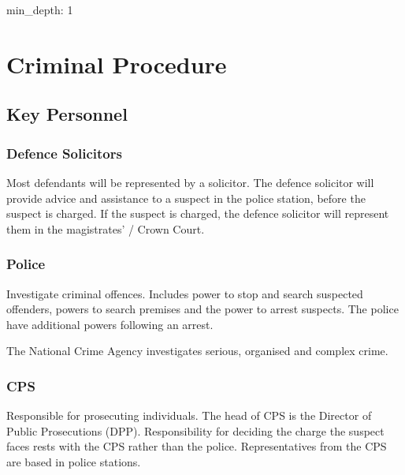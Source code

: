 \documentclass[
]{article}
\author{}
\date{}
\newenvironment{Shaded}{}{}
\newcommand{\NormalTok}[1]{#1}
\begin{document}
{
\setcounter{tocdepth}{3}
\tableofcontents
}
\begin{Shaded}
\begin{Highlighting}[]
\NormalTok{min\_depth: 1}
\end{Highlighting}
\end{Shaded}

\hypertarget{criminal-procedure}{%
\section{Criminal Procedure}\label{criminal-procedure}}

\hypertarget{key-personnel}{%
\subsection{Key Personnel}\label{key-personnel}}

\hypertarget{defence-solicitors}{%
\subsubsection{Defence Solicitors}\label{defence-solicitors}}

Most defendants will be represented by a solicitor. The defence
solicitor will provide advice and assistance to a suspect in the police
station, before the suspect is charged. If the suspect is charged, the
defence solicitor will represent them in the magistrates' / Crown Court.

\hypertarget{police}{%
\subsubsection{Police}\label{police}}

Investigate criminal offences. Includes power to stop and search
suspected offenders, powers to search premises and the power to arrest
suspects. The police have additional powers following an arrest.

The National Crime Agency investigates serious, organised and complex
crime.

\hypertarget{cps}{%
\subsubsection{CPS}\label{cps}}

Responsible for prosecuting individuals. The head of CPS is the Director
of Public Prosecutions (DPP). Responsibility for deciding the charge the
suspect faces rests with the CPS rather than the police. Representatives
from the CPS are based in police stations.
\end{document}
